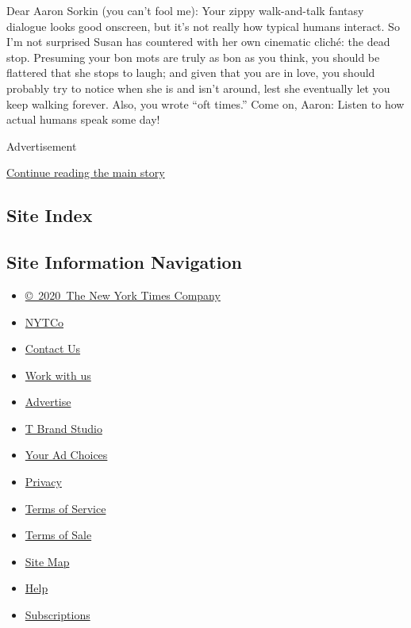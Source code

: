 Dear Aaron Sorkin (you can't fool me): Your zippy walk-and-talk fantasy
dialogue looks good onscreen, but it's not really how typical humans
interact. So I'm not surprised Susan has countered with her own
cinematic cliché: the dead stop. Presuming your bon mots are truly as
bon as you think, you should be flattered that she stops to laugh; and
given that you are in love, you should probably try to notice when she
is and isn't around, lest she eventually let you keep walking forever.
Also, you wrote ``oft times.'' Come on, Aaron: Listen to how actual
humans speak some day!

Advertisement

\protect\hyperlink{after-bottom}{Continue reading the main story}

\hypertarget{site-index}{%
\subsection{Site Index}\label{site-index}}

\hypertarget{site-information-navigation}{%
\subsection{Site Information
Navigation}\label{site-information-navigation}}

\begin{itemize}
\tightlist
\item
  \href{https://help.nytimes.com/hc/en-us/articles/115014792127-Copyright-notice}{©~2020~The
  New York Times Company}
\end{itemize}

\begin{itemize}
\tightlist
\item
  \href{https://www.nytco.com/}{NYTCo}
\item
  \href{https://help.nytimes.com/hc/en-us/articles/115015385887-Contact-Us}{Contact
  Us}
\item
  \href{https://www.nytco.com/careers/}{Work with us}
\item
  \href{https://nytmediakit.com/}{Advertise}
\item
  \href{http://www.tbrandstudio.com/}{T Brand Studio}
\item
  \href{https://www.nytimes.com/privacy/cookie-policy\#how-do-i-manage-trackers}{Your
  Ad Choices}
\item
  \href{https://www.nytimes.com/privacy}{Privacy}
\item
  \href{https://help.nytimes.com/hc/en-us/articles/115014893428-Terms-of-service}{Terms
  of Service}
\item
  \href{https://help.nytimes.com/hc/en-us/articles/115014893968-Terms-of-sale}{Terms
  of Sale}
\item
  \href{https://spiderbites.nytimes.com}{Site Map}
\item
  \href{https://help.nytimes.com/hc/en-us}{Help}
\item
  \href{https://www.nytimes.com/subscription?campaignId=37WXW}{Subscriptions}
\end{itemize}
